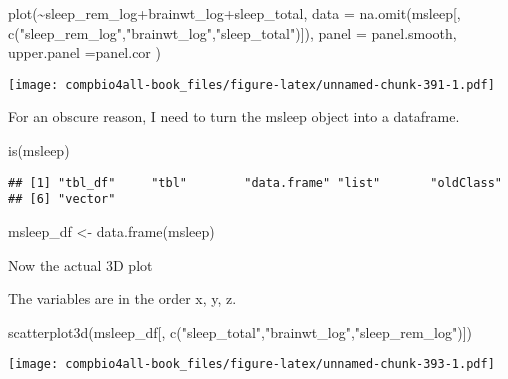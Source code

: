 \documentclass[
]{book}
\newenvironment{Shaded}{\begin{snugshade}}{\end{snugshade}}
\newcommand{\AttributeTok}[1]{\textcolor[rgb]{0.77,0.63,0.00}{#1}}
\newcommand{\FunctionTok}[1]{\textcolor[rgb]{0.00,0.00,0.00}{#1}}
\newcommand{\NormalTok}[1]{#1}
\newcommand{\OtherTok}[1]{\textcolor[rgb]{0.56,0.35,0.01}{#1}}
\newcommand{\SpecialCharTok}[1]{\textcolor[rgb]{0.00,0.00,0.00}{#1}}
\newcommand{\StringTok}[1]{\textcolor[rgb]{0.31,0.60,0.02}{#1}}
\begin{document}
\begin{Shaded}
\begin{Highlighting}[]
\FunctionTok{plot}\NormalTok{(}\SpecialCharTok{\textasciitilde{}}\NormalTok{sleep\_rem\_log}\SpecialCharTok{+}\NormalTok{brainwt\_log}\SpecialCharTok{+}\NormalTok{sleep\_total, }
     \AttributeTok{data =} \FunctionTok{na.omit}\NormalTok{(msleep[, }\FunctionTok{c}\NormalTok{(}\StringTok{"sleep\_rem\_log"}\NormalTok{,}\StringTok{"brainwt\_log"}\NormalTok{,}\StringTok{"sleep\_total"}\NormalTok{)]),}
     \AttributeTok{panel =}\NormalTok{ panel.smooth,}
      \AttributeTok{upper.panel =}\NormalTok{panel.cor )}
\end{Highlighting}
\end{Shaded}

\texttt{[image: compbio4all-book\_files/figure-latex/unnamed-chunk-391-1.pdf]}

For an obscure reason, I need to turn the msleep object into a dataframe.

\begin{Shaded}
\begin{Highlighting}[]
\FunctionTok{is}\NormalTok{(msleep)}
\end{Highlighting}
\end{Shaded}

\begin{verbatim}
## [1] "tbl_df"     "tbl"        "data.frame" "list"       "oldClass"  
## [6] "vector"
\end{verbatim}

\begin{Shaded}
\begin{Highlighting}[]
\NormalTok{msleep\_df }\OtherTok{\textless{}{-}} \FunctionTok{data.frame}\NormalTok{(msleep)}
\end{Highlighting}
\end{Shaded}

Now the actual 3D plot

The variables are in the order x, y, z.

\begin{Shaded}
\begin{Highlighting}[]
\FunctionTok{scatterplot3d}\NormalTok{(msleep\_df[, }\FunctionTok{c}\NormalTok{(}\StringTok{"sleep\_total"}\NormalTok{,}\StringTok{"brainwt\_log"}\NormalTok{,}\StringTok{"sleep\_rem\_log"}\NormalTok{)])}
\end{Highlighting}
\end{Shaded}

\texttt{[image: compbio4all-book\_files/figure-latex/unnamed-chunk-393-1.pdf]}
\end{document}
